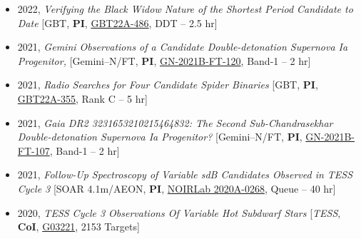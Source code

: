 \documentclass[letterpaper,12pt]{article}
\begin{document}
\vspace{3mm}
\noindent{}
\vspace{-4mm}
\begin{itemize}
\item 2022, \textit{Verifying the Black Widow Nature of the Shortest Period Candidate to Date} [GBT, \textbf{PI}, \href{https://dss.gb.nrao.edu/project/GBT22A-486}{\textcolor{rotundaorange}{GBT22A-486}}, DDT -- 2.5 hr]
\item 2021, \textit{Gemini Observations of a Candidate Double-detonation Supernova Ia Progenitor,} [Gemini--N/FT, \textbf{PI}, \href{https://www.gemini.edu/observing/schedules-and-queue/2021b-gn-queue-band-1-3/2021b-gn-ft-programs}{\textcolor{rotundaorange}{GN-2021B-FT-120}}, Band-1 -- 2 hr]
\item 2021, \textit{Radio Searches for Four Candidate Spider Binaries} [GBT, \textbf{PI}, \href{https://dss.gb.nrao.edu/project/GBT22A-355}{\textcolor{rotundaorange}{GBT22A-355}}, Rank C -- 5 hr]
\item 2021, \textit{Gaia DR2 3231653210215464832: The Second Sub-Chandrasekhar Double-detonation Supernova Ia Progenitor?} [Gemini--N/FT, \textbf{PI}, \href{https://www.gemini.edu/observing/schedules-and-queue/2021b-gn-queue-band-1-3/2021b-gn-ft-programs}{\textcolor{rotundaorange}{GN-2021B-FT-107}}, Band-1 -- 2 hr]
\item 2021, \textit{Follow-Up Spectroscopy of Variable sdB Candidates Observed in TESS Cycle 3} [SOAR 4.1m/AEON, \textbf{PI}, \href{http://www.soartelescope.org/soar/content/aeon-features-2021a}{\textcolor{rotundaorange}{NOIRLab  2020A-0268}}, Queue -- 40 hr]
\item 2020, \textit{TESS Cycle 3 Observations Of Variable Hot Subdwarf Stars} [\textit{TESS}, \textbf{CoI}, \href{https://heasarc.gsfc.nasa.gov/docs/tess/data/approved-programs/cycle3/G03221.txt}{\textcolor{rotundaorange}{G03221}}, 2153 Targets]

\end{itemize}
\end{document}
